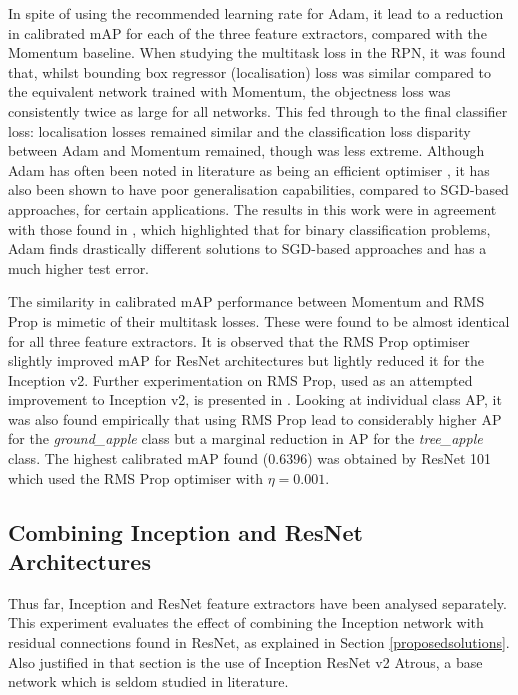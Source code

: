 \documentclass[journal]{IEEEtran}
\begin{document}
In spite of using the recommended learning rate for Adam, it lead to a reduction in calibrated mAP for each of the three feature extractors, compared with the Momentum baseline. When studying the multitask loss in the RPN, it was found that, whilst bounding box regressor (localisation) loss was similar compared to the equivalent network trained with Momentum, the objectness loss was consistently twice as large for all networks. This fed through to the final classifier loss: localisation losses remained similar and the classification loss disparity between Adam and Momentum remained, though was less extreme. Although Adam has often been noted in literature as being an efficient optimiser \cite{optimiserreviewpaper}, it has also been shown to have poor generalisation capabilities, compared to SGD-based approaches, for certain applications. The results in this work were in agreement with those found in \cite{optimisergeneralistationissues}, which highlighted that for binary classification problems, Adam finds drastically different solutions to SGD-based approaches and has a much higher test error.


The similarity in calibrated mAP performance between Momentum and RMS Prop is mimetic of their multitask losses. These were found to be almost identical for all three feature extractors. It is observed that the RMS Prop optimiser slightly improved mAP for ResNet architectures but lightly reduced it for the Inception v2. Further experimentation on RMS Prop, used as an attempted improvement to Inception v2, is presented in \cite{inceptionv2}. Looking at individual class AP, it was also found empirically that using RMS Prop lead to considerably higher AP for the \textit{ground\_apple} class but a marginal reduction in AP for the \textit{tree\_apple} class. The highest calibrated mAP found (0.6396) was obtained by ResNet 101 which used the RMS Prop optimiser with $\eta = 0.001$.













\subsection{Combining Inception and ResNet Architectures}

Thus far, Inception and ResNet feature extractors have been analysed separately. This experiment evaluates the effect of combining the Inception network with residual connections found in ResNet, as explained in Section \ref{proposedsolutions}. Also justified in that section is the use of Inception ResNet v2 Atrous, a base network which is seldom studied in literature.
\end{document}
